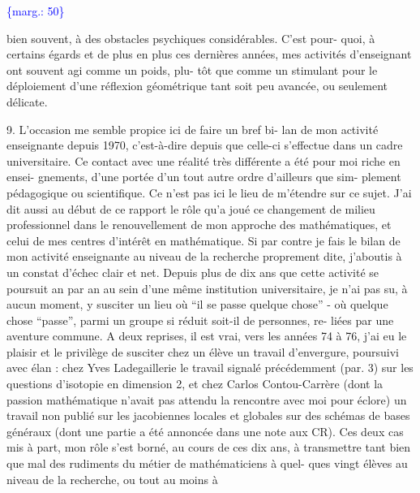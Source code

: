 \documentclass[11pt]{article}
\newcommand{\scanpage}[1]{\par\bigskip\noindent{\small\sffamily[scan #1]}\par}
\newcommand{\mspage}[1]{{\small\sffamily[p.\,#1]}}
\newcommand{\margin}[1]{\textcolor{blue}{\{\textsf{marg.:} #1\}}}
\begin{document}
\margin{50}

\clearpage
\scanpage{119/51}
\mspage{49}

bien souvent, à des obstacles psychiques considérables. C'est pour-%
quoi, à certains égards et de plus en plus ces dernières années,
mes activités d'enseignant ont souvent agi comme un poids, plu-%
tôt que comme un stimulant pour le déploiement d'une réflexion
géométrique tant soit peu avancée, ou seulement délicate.

9. L'occasion me semble propice ici de faire un bref bi-%
lan de mon activité enseignante depuis 1970, c'est-à-dire depuis
que celle-ci s'effectue dans un cadre universitaire. Ce contact
avec une réalité très différente a été pour moi riche en ensei-%
gnements, d'une portée d'un tout autre ordre d'ailleurs que sim-%
plement pédagogique ou scientifique. Ce n'est pas ici le lieu de
m'étendre sur ce sujet. J'ai dit aussi au début de ce rapport le
rôle qu'a joué ce changement de milieu professionnel dans le
renouvellement de mon approche des mathématiques, et celui de mes
centres d'intérêt en mathématique. Si par contre je fais le bilan
de mon activité enseignante au niveau de la recherche proprement
dite, j'aboutis à un constat d'échec clair et net. Depuis plus
de dix ans que cette activité se poursuit an par an au sein d'une
même institution universitaire, je n'ai pas su, à aucun moment,
y susciter un lieu où ``il se passe quelque chose'' - où quelque
chose ``passe'', parmi un groupe si réduit soit-il de personnes, re-%
liées par une aventure commune. A deux reprises, il est vrai, vers
les années 74 à 76, j'ai eu le plaisir et le privilège de susciter
chez un élève un travail d'envergure, poursuivi avec élan : chez
Yves Ladegaillerie le travail signalé précédemment (par. 3) sur
les questions d'isotopie en dimension 2, et chez Carlos Contou-Carrère
(dont la passion mathématique n'avait pas attendu la rencontre
avec moi pour éclore) un travail non publié sur les jacobiennes
locales et globales sur des schémas de bases généraux (dont une
partie a été annoncée dans une note aux CR). Ces deux cas mis à
part, mon rôle s'est borné, au cours de ces dix ans, à transmettre
tant bien que mal des rudiments du métier de mathématiciens à quel-%
ques vingt élèves au niveau de la recherche, ou tout au moins à
\end{document}
